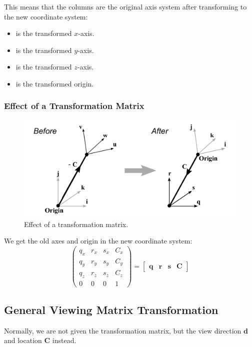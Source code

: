 \documentclass[11pt]{article}
\begin{document}
This means that the columns are the original axis system after transforming to the new coordinate system:
\begin{itemize}
  \item {} is the transformed $x$-axis.
  \item {} is the transformed $y$-axis.
  \item {} is the transformed $z$-axis.
  \item {} is the transformed origin.
\end{itemize}

\subsubsection{Effect of a Transformation Matrix}
\begin{figure}[htb!]
  \caption{Effect of a transformation matrix.}
  \includegraphics[scale=0.2]{effecttransform}
  \centering
\end{figure}

We get the old axes and origin in the new coordinate system:
\[
  \begin{pmatrix}
    q_x & r_x & s_x & C_x \\
    q_y & r_y & s_y & C_y \\
    q_z & r_z & s_z & C_z \\
    0 & 0 & 0 & 1
  \end{pmatrix}
  =
  \begin{bmatrix} \bm{q} & \bm{r} & \bm{s} & \bm{C} \end{bmatrix}
\]

\subsection{General Viewing Matrix Transformation}
Normally, we are not given the transformation matrix, but the view direction $\bm{d}$ and location $\bm{C}$ instead.
\end{document}
